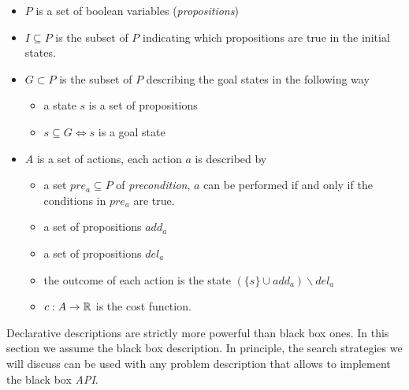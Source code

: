 \documentclass[10pt, letterpaper]{report}
\begin{document}
\begin{itemize}
    \item $P$ is a set of boolean variables (\textit{propositions})
    \item $I\subseteq P$ is the subset of $P$ indicating which propositions are true in the initial states.
    \item $G\subset P$ is the subset of $P$ describing the goal states in the following way\begin{itemize}
        \item a state $s$ is a set of propositions 
        \item $s\subseteq G \iff s$ is a goal state
    \end{itemize}
    \item $A$ is a set of actions, each action $a$ is described by\begin{itemize}
        \item a set $pre_a\subseteq P$ of \textit{precondition}, $a$ can be performed if and only if the conditions in $pre_a$ are true.
        \item a set of propositions $add_a$
        \item a set of propositions $del_a$
        \item the outcome of each action is the state $(\{s\}\cup add_a )\backslash del_a$
        \item $c:A\rightarrow{\mathbb R}$ is the cost function.
    \end{itemize}
\end{itemize}
Declarative descriptions are strictly more powerful than black box ones. In this section we assume the black box description. In principle, the search strategies we will discuss can be used with any
problem description that allows to implement the black box \textit{API}.
\end{document}
